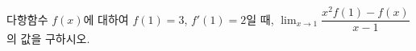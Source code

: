다항함수 $f(x)$에 대하여 $f(1)=3$, $f'(1)=2$일 때, $\displaystyle\lim_{x\to 1}\dfrac{x^2f(1)-f(x)}{x-1}$의 값을 구하시오.
